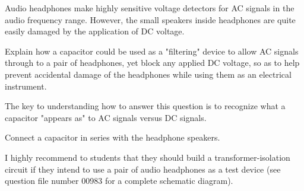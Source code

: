 

Audio headphones make highly sensitive voltage detectors for AC signals in the audio frequency range.  However, the small speakers inside headphones are quite easily damaged by the application of DC voltage.

Explain how a capacitor could be used as a "filtering" device to allow AC signals through to a pair of headphones, yet block any applied DC voltage, so as to help prevent accidental damage of the headphones while using them as an electrical instrument.

The key to understanding how to answer this question is to recognize what a capacitor "appears as" to AC signals versus DC signals.







Connect a capacitor in series with the headphone speakers.







I highly recommend to students that they should build a transformer-isolation circuit if they intend to use a pair of audio headphones as a test device (see question file number 00983 for a complete schematic diagram).




